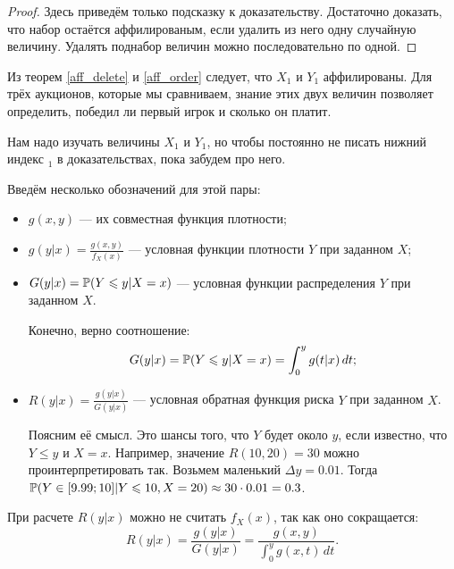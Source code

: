 \begin{proof}
Здесь приведём только подсказку к доказательству. Достаточно доказать, что набор остаётся аффилированым, если удалить из него одну случайную величину. Удалять поднабор величин можно последовательно по одной. \end{proof}


Из теорем \ref{aff_delete} и \ref{aff_order} следует, что $ X_{1} $ и $ Y_{1} $ аффилированы. Для трёх аукционов, которые мы сравниваем, знание этих двух величин позволяет определить, победил ли первый игрок и сколько он платит.

Нам надо изучать величины $ X_{1} $ и $ Y_{1} $, но чтобы постоянно не писать нижний индекс $ _{1} $ в доказательствах, пока забудем про него.

Введём несколько обозначений для этой пары:
\begin{itemize}
\item $ g(x,y) $ — их совместная функция плотности;
\item $ g(y|x)=\frac{g(x,y)}{f_{X}(x)} $ — условная функции плотности $ Y $ при заданном $ X $;
\item $ G(y|x)=\P(Y\leq y|X=x)$ — условная функции распределения $ Y $ при заданном $ X $.

Конечно, верно соотношение:
\begin{equation}
G(y|x)=\P(Y\leq y|X=x)=\int_{0}^{y}g(t|x) \, dt;
\end{equation}

\item $ R(y|x)=\frac{g(y|x)}{G(y|x)} $ — условная обратная функция риска $ Y $ при заданном $ X $.

Поясним её смысл. Это шансы того, что $ Y $ будет около $ y $, если известно, что $ Y\leq y $ и $ X=x $. Например, значение $ R(10,20)=30 $ можно проинтерпретировать так. Возьмем маленький $ \Delta y=0.01 $. Тогда $ \P(Y\in [9.99;10]|Y\leq 10, X=20)\approx 30\cdot 0.01=0.3 $.
\end{itemize}

При расчете $ R(y|x) $ можно не считать $ f_{X}(x) $, так как оно сокращается:
\begin{equation}
R(y|x)=\frac{g(y|x)}{G(y|x)}=\frac{g(x,y)}{\int_{0}^{y}g(x,t) \, dt}.
\end{equation}

